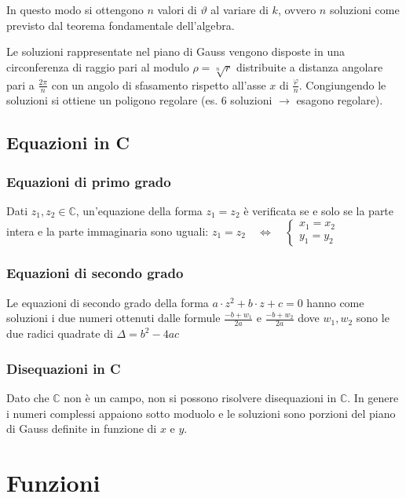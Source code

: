 \documentclass[a4paper]{article}
\begin{document}
In questo modo si ottengono \(n\) valori di \(\vartheta\) al variare di \(k\), ovvero \(n\) soluzioni come previsto dal teorema fondamentale dell'algebra.

Le soluzioni rappresentate nel piano di Gauss vengono disposte in una circonferenza di raggio pari al modulo \(\rho = \sqrt[n]{r}\) distribuite
a distanza angolare pari a \(\frac{2 \pi}{n}\) con un angolo di sfasamento rispetto all'asse \(x\) di \(\frac{\varphi}{n}\). 
Congiungendo le soluzioni si ottiene un poligono regolare (es. 6 soluzioni \(\to\) esagono regolare).

\subsection{Equazioni in C}
\subsubsection*{Equazioni di primo grado}
Dati \(z_1, z_2 \in \mathbb{C}\), un'equazione della forma \(z_1 = z_2\) è verificata se e solo se la parte intera e la parte immaginaria sono
uguali: \(z_1 = z_2 \quad \Leftrightarrow \quad \begin{cases}
	x_1 = x_2 \\
	y_1 = y_2
\end{cases}\) 

\subsubsection*{Equazioni di secondo grado}
Le equazioni di secondo grado della forma \(a \cdot z^2 + b \cdot z + c = 0\) hanno come soluzioni i due numeri ottenuti dalle formule
\(\displaystyle \frac{-b + w_1}{2a}\) e \(\displaystyle \frac{-b + w_2}{2a}\) dove \(w_1, w_2\) sono le due radici quadrate di \(\Delta = b^2 - 4ac\)

\subsubsection*{Disequazioni in C}
Dato che \(\mathbb{C}\) non è un campo, non si possono risolvere disequazioni in \(\mathbb{C}\). In genere i numeri complessi appaiono
sotto moduolo e le soluzioni sono porzioni del piano di Gauss definite in funzione di \(x\) e \(y\).

\newpage


\section{Funzioni}
\end{document}
